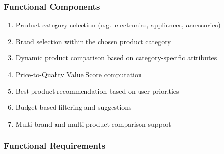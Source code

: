 \subsubsection{Functional Components}

\begin{enumerate}
    \item Product category selection (e.g., electronics, appliances, accessories)
    \item Brand selection within the chosen product category
    \item Dynamic product comparison based on category-specific attributes
    \item Price-to-Quality Value Score computation
    \item Best product recommendation based on user priorities
    \item Budget-based filtering and suggestions
    \item Multi-brand and multi-product comparison support
\end{enumerate}

\subsubsection{Functional Requirements}

